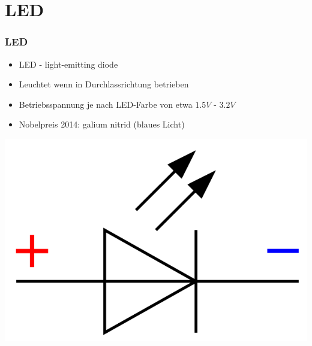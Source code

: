 \section*{LED}

\begin{frame}
    \frametitle{LED}
      	\begin{itemize}
			\item LED - light-emitting diode
			\item Leuchtet wenn in Durchlassrichtung betrieben
			\item Betriebsspannung je nach LED-Farbe von etwa $1.5V$ - $3.2V$
            \item Nobelpreis 2014: galium nitrid (blaues Licht)
    \end{itemize}    
    \begin{center}
        \includegraphics[height=.5\textheight]{e12/Symbol_LED.png}
	\end{center}
\end{frame}

